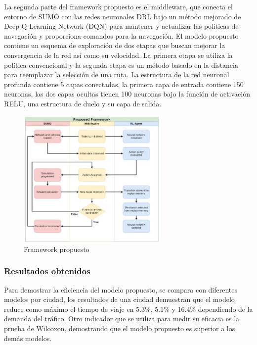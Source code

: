 La segunda parte del framework propuesto es el middleware, que conecta el entorno de SUMO con las redes neuronales DRL bajo un método mejorado de Deep Q-Learning Network (DQN) para mantener y actualizar las políticas de navegación y proporciona comandos para la navegación. El modelo propuesto contiene un esquema de exploración de dos etapas que buscan mejorar la convergencia de la red así como su velocidad. La primera etapa se utiliza la política convencional y la segunda etapa es un método basado en la distancia para reemplazar la selección de una ruta. La estructura de la red neuronal profunda contiene 5 capas conectadas, la primera capa de entrada contiene 150 neuronas, las dos capas ocultas tienen 100 neuronas bajo la función de activación RELU, una estructura de duelo y su capa de salida. %

\begin{figure}[h]
	\begin{center}
		\includegraphics[width=0.65\textwidth]{2/figures/SUMO.jpg}
		\caption{Framework propuesto}
		\label{1:fig2}
	\end{center}
\end{figure}

\subsubsection{Resultados obtenidos}
Para demostrar la eficiencia del modelo propuesto, se compara con diferentes modelos por ciudad, los resultados de una ciudad demuestran que el modelo reduce como máximo el tiempo de viaje en 5.3\%, 5.1\% y 16.4\% dependiendo de la demanda del tráfico. Otro indicador que se utiliza para medir su eficacia es la prueba de Wilcoxon, demostrando que el modelo propuesto es superior a los demás modelos.%

